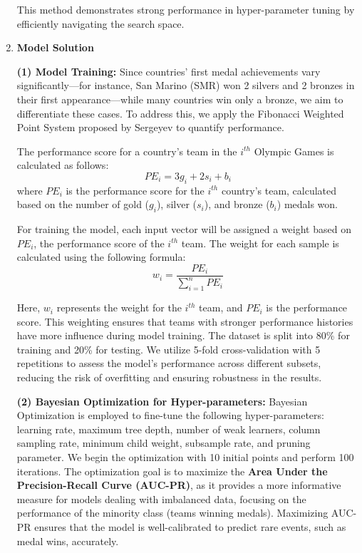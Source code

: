 \documentclass[12pt]{article}  %
\begin{document}
\begin{enumerate}[\textbullet]
This method demonstrates strong performance in hyper-parameter tuning by efficiently navigating the search space.

\item \textbf{Model Solution}

\textbf{(1) Model Training:} Since countries' first medal achievements vary significantly—for instance, San Marino (SMR) won 2 silvers and 2 bronzes in their first appearance—while many countries win only a bronze, we aim to differentiate these cases. To address this, we apply the Fibonacci Weighted Point System proposed by Sergeyev to quantify performance\cite{3}.
    
    The performance score for a country's team in the $i^{th}$ Olympic Games is calculated as follows:
    \begin{equation}
        PE_i=3g_i+2s_i+b_i \tag{12}
    \end{equation}
    where $PE_i$ is the performance score for the $i^{th}$ country's team, calculated based on the number of gold ($g_i$), silver ($s_i$), and bronze ($b_i$) medals won.
    
    For training the model, each input vector will be assigned a weight based on $PE_i$, the performance score of the $i^{th}$ team. The weight for each sample is calculated using the following formula:
    \begin{equation}
        w_i = \frac{PE_i}{\sum_{i=1}^{n} PE_i} \tag{13}
    \end{equation}

    Here, $w_i$ represents the weight for the $i^{th}$ team, and $PE_i$ is the performance score. This weighting ensures that teams with stronger performance histories have more influence during model training. The dataset is split into 80\% for training and 20\% for testing. We utilize 5-fold cross-validation with 5 repetitions to assess the model’s performance across different subsets, reducing the risk of overfitting and ensuring robustness in the results.

\textbf{(2) Bayesian Optimization for Hyper-parameters:} Bayesian Optimization is employed to fine-tune the following hyper-parameters: learning rate, maximum tree depth, number of weak learners, column sampling rate, minimum child weight, subsample rate, and pruning parameter. We begin the optimization with 10 initial points and perform 100 iterations. The optimization goal is to maximize the \textbf{Area Under the Precision-Recall Curve (AUC-PR)}, as it provides a more informative measure for models dealing with imbalanced data, focusing on the performance of the minority class (teams winning medals)\cite{9}. Maximizing AUC-PR ensures that the model is well-calibrated to predict rare events, such as medal wins, accurately.


\end{enumerate}
\end{document}
